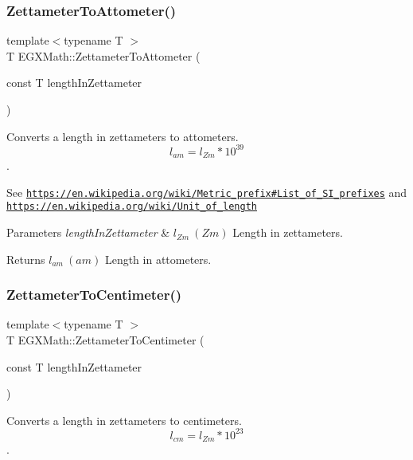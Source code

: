 \subsubsection{\texorpdfstring{Zettameter\+To\+Attometer()}{ZettameterToAttometer()}}
{\footnotesize\ttfamily template$<$typename T $>$ \\
T E\+G\+X\+Math\+::\+Zettameter\+To\+Attometer (\begin{DoxyParamCaption}\item[{const T}]{length\+In\+Zettameter }\end{DoxyParamCaption})}



Converts a length in zettameters to attometers. \[ l_{am}=l_{Zm} * 10^{39} \]. 

See \href{https://en.wikipedia.org/wiki/Metric_prefix#List_of_SI_prefixes}{\tt https\+://en.\+wikipedia.\+org/wiki/\+Metric\+\_\+prefix\#\+List\+\_\+of\+\_\+\+S\+I\+\_\+prefixes} and \href{https://en.wikipedia.org/wiki/Unit_of_length}{\tt https\+://en.\+wikipedia.\+org/wiki/\+Unit\+\_\+of\+\_\+length} 
\begin{DoxyParams}{Parameters}
{\em length\+In\+Zettameter} & $ l_{Zm}\ (Zm)$ Length in zettameters. \\
\hline
\end{DoxyParams}
\begin{DoxyReturn}{Returns}
$ l_{am}\ (am)$ Length in attometers. 
\end{DoxyReturn}
\mbox{\label{group___e_g_x_math-_conversions-_length_conversions-_zettameter-_s_i_gae555780970b9583ec04265ea8e422e7c}} 
\subsubsection{\texorpdfstring{Zettameter\+To\+Centimeter()}{ZettameterToCentimeter()}}
{\footnotesize\ttfamily template$<$typename T $>$ \\
T E\+G\+X\+Math\+::\+Zettameter\+To\+Centimeter (\begin{DoxyParamCaption}\item[{const T}]{length\+In\+Zettameter }\end{DoxyParamCaption})}



Converts a length in zettameters to centimeters. \[ l_{cm}=l_{Zm} * 10^{23} \]. 

